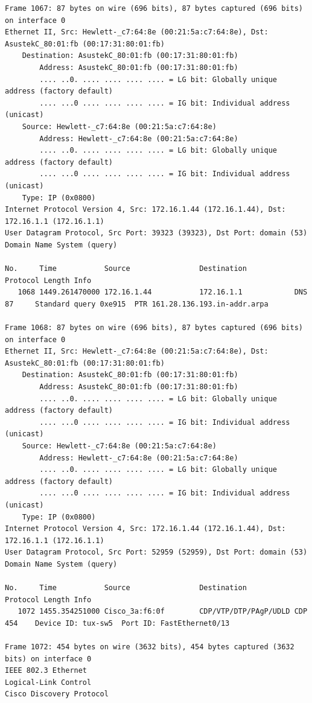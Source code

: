 \documentclass[a4paper,11pt]{article}
\begin{document}
\begin{lstlisting}
Frame 1067: 87 bytes on wire (696 bits), 87 bytes captured (696 bits) on interface 0
Ethernet II, Src: Hewlett-_c7:64:8e (00:21:5a:c7:64:8e), Dst: AsustekC_80:01:fb (00:17:31:80:01:fb)
    Destination: AsustekC_80:01:fb (00:17:31:80:01:fb)
        Address: AsustekC_80:01:fb (00:17:31:80:01:fb)
        .... ..0. .... .... .... .... = LG bit: Globally unique address (factory default)
        .... ...0 .... .... .... .... = IG bit: Individual address (unicast)
    Source: Hewlett-_c7:64:8e (00:21:5a:c7:64:8e)
        Address: Hewlett-_c7:64:8e (00:21:5a:c7:64:8e)
        .... ..0. .... .... .... .... = LG bit: Globally unique address (factory default)
        .... ...0 .... .... .... .... = IG bit: Individual address (unicast)
    Type: IP (0x0800)
Internet Protocol Version 4, Src: 172.16.1.44 (172.16.1.44), Dst: 172.16.1.1 (172.16.1.1)
User Datagram Protocol, Src Port: 39323 (39323), Dst Port: domain (53)
Domain Name System (query)

No.     Time           Source                Destination           Protocol Length Info
   1068 1449.261470000 172.16.1.44           172.16.1.1            DNS      87     Standard query 0xe915  PTR 161.28.136.193.in-addr.arpa

Frame 1068: 87 bytes on wire (696 bits), 87 bytes captured (696 bits) on interface 0
Ethernet II, Src: Hewlett-_c7:64:8e (00:21:5a:c7:64:8e), Dst: AsustekC_80:01:fb (00:17:31:80:01:fb)
    Destination: AsustekC_80:01:fb (00:17:31:80:01:fb)
        Address: AsustekC_80:01:fb (00:17:31:80:01:fb)
        .... ..0. .... .... .... .... = LG bit: Globally unique address (factory default)
        .... ...0 .... .... .... .... = IG bit: Individual address (unicast)
    Source: Hewlett-_c7:64:8e (00:21:5a:c7:64:8e)
        Address: Hewlett-_c7:64:8e (00:21:5a:c7:64:8e)
        .... ..0. .... .... .... .... = LG bit: Globally unique address (factory default)
        .... ...0 .... .... .... .... = IG bit: Individual address (unicast)
    Type: IP (0x0800)
Internet Protocol Version 4, Src: 172.16.1.44 (172.16.1.44), Dst: 172.16.1.1 (172.16.1.1)
User Datagram Protocol, Src Port: 52959 (52959), Dst Port: domain (53)
Domain Name System (query)

No.     Time           Source                Destination           Protocol Length Info
   1072 1455.354251000 Cisco_3a:f6:0f        CDP/VTP/DTP/PAgP/UDLD CDP      454    Device ID: tux-sw5  Port ID: FastEthernet0/13  

Frame 1072: 454 bytes on wire (3632 bits), 454 bytes captured (3632 bits) on interface 0
IEEE 802.3 Ethernet 
Logical-Link Control
Cisco Discovery Protocol


\end{lstlisting}
\end{document}
